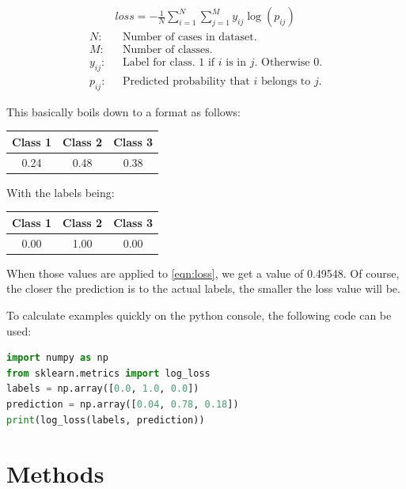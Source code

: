 \documentclass[12pt,a4paper]{scrartcl}
\begin{document}
\begin{align}\label{eqn:loss}
&loss = -\frac1N\sum_{i=1}^N\sum_{j=1}^My_{ij}\log\left(p_{ij}\right)\\
\nonumber
N: & \hspace{8pt} \textrm{Number of cases in dataset.}\\
\nonumber
M: & \hspace{8pt} \textrm{Number of classes.}\\
\nonumber
y_{ij}: & \hspace{8pt} \textrm{Label for class. 1 if $i$ is in $j$. Otherwise 0.}\\
\nonumber
p_{ij}: & \hspace{8pt} \textrm{Predicted probability that $i$ belongs to $j$.}
\end{align}

This basically boils down to a format as follows:

\begin{center}
\begin{tabular}{c|c|c}
Class 1 & Class 2 & Class 3\\\hline
0.24 & 0.48 & 0.38
\end{tabular}
\end{center}

With the labels being:

\begin{center}
\begin{tabular}{c|c|c}
Class 1 & Class 2 & Class 3\\\hline
0.00 & 1.00 & 0.00
\end{tabular}
\end{center}

When those values are applied to \ref{eqn:loss}, we get a value of 0.49548. Of course, the closer the prediction is to the actual labels, the smaller the loss value will be.

To calculate examples quickly on the python console, the following code can be used:
\begin{lstlisting}[language=python,otherkeywords={as},label=lst:loglosscalculation,caption={Quick Log Loss Calculation in python}]
import numpy as np
from sklearn.metrics import log_loss
labels = np.array([0.0, 1.0, 0.0])
prediction = np.array([0.04, 0.78, 0.18])
print(log_loss(labels, prediction))
\end{lstlisting}


\pagebreak
\section{Methods}\label{s:methods}
\end{document}
